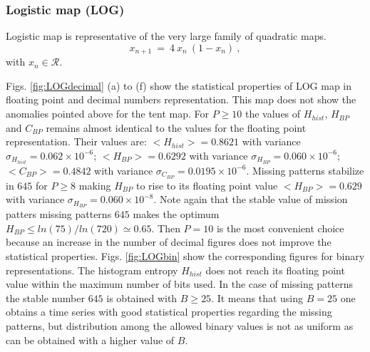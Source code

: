 \subsubsection{Logistic map (LOG)} \label{subsubsec:log}

Logistic map is representative of the very large family of quadratic maps. 
\begin{equation}\label{eq:logimap}
 x_{n+1}~=~4~x_n~(1-x_n) \ ,
\end{equation}
with $x_n\in\mathcal{R}$.
 
Figs. \ref{fig:LOGdecimal} (a) to (f) show the statistical properties of LOG map in floating point and decimal numbers representation. This map does not show the anomalies pointed above for the tent map. For $P\geq 10$ the values of $H_{hist}$, $H_{BP}$ and $C_{BP}$ remains almost identical to the values for the floating point representation. Their values are: $<H_{hist}>=0.8621$ with variance $\sigma_{H_{hist}}=0.062 \times 10^{-6}$; $<H_{BP}>=0.6292$ with variance $\sigma_{H_{BP}}=0.060 \times 10^{-6}$; $<C_{BP}>=0.4842$ with variance $\sigma_{C_{BP}}=0.0195 \times 10^{-6}$. Missing patterns stabilize in $645$ for $P \geq 8$ making $H_{BP}$ to rise to its floating point value $<H_{BP}>=0.629$ with variance $\sigma_{H_{BP}}=0.060 \times 10^{-8}$. Note again that the stable value of mission patters missing patterns $645$ makes the optimum $H_{BP} \leq ln(75)/ln(720) \simeq 0.65$. Then $P=10$ is the most convenient choice because an increase in the number of decimal figures does not improve the statistical properties. 
Figs. \ref{fig:LOGbin} show the corresponding figures for binary representations. The histogram entropy $H_{hist}$ does not reach its floating point value within the maximum number of bits used. In the case of missing patterns the stable number $645$ is obtained with $B \geq 25$. It means that using $B=25$ one obtains a time series with good statistical properties regarding the missing patterns, but distribution among the allowed binary values is not as uniform as can be obtained with a higher value of $B$. 

